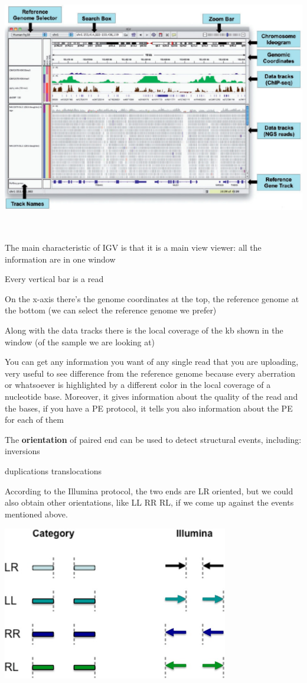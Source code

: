 \includegraphics[width=6.32631in,height=4.35875in]{image19.jpeg}

The main characteristic of IGV is that it is a main view viewer: all the
information are in one window

Every vertical bar is a read

On the x-axis there's the genome coordinates at the top, the reference genome at
the bottom (we can select the reference genome we prefer)

Along with the data tracks there is the local coverage of the kb shown in the
window (of the sample we are looking at)

You can get any information you want of any single read that you are uploading,
very useful to see difference from the reference genome because every aberration
or whatsoever is highlighted by a different color in the local coverage of a
nucleotide base. Moreover, it gives information about the quality of the read
and the bases, if you have a PE protocol, it tells you also information about
the PE for each of them

The \textbf{orientation} of paired end can be used to detect structural events,
including: inversions

duplications translocations

According to the Illumina protocol, the two ends are LR oriented, but we could
also obtain other orientations, like LL RR RL, if we come up against the events
mentioned above.


\includegraphics[width=3.89062in,height=2.65in]{image20.jpeg}


